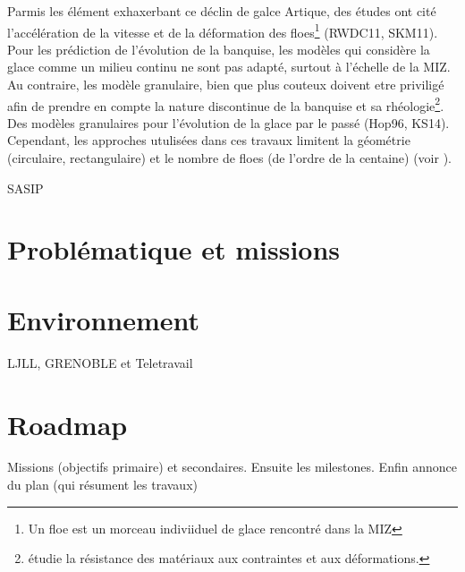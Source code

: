 Parmis les élément exhaxerbant ce déclin de galce Artique, des études ont cité l'accélération de la vitesse et de la déformation des floes\footnote{Un floe est un morceau indiviiduel de glace rencontré dans la MIZ} (RWDC11, SKM11). Pour les prédiction de l'évolution de la banquise, les modèles qui considère la glace comme un milieu continu ne sont pas adapté, surtout à l'échelle de la MIZ. Au contraire, les modèle granulaire, bien que plus couteux doivent etre priviligé afin de prendre en compte la nature discontinue de la banquise et sa rhéologie\footnote{étudie la résistance des matériaux aux contraintes et aux déformations.}. Des modèles granulaires pour l'évolution de la glace par le passé (Hop96, KS14). Cependant, les approches utulisées dans ces travaux limitent la géométrie (circulaire, rectangulaire) et le nombre de floes (de l'ordre de la centaine) (voir \parencite[p.16]{balasoiu2020halthesis}).


SASIP 








\section{Problématique et missions}













\section{Environnement}

LJLL, GRENOBLE et Teletravail










\section{Roadmap}
Missions (objectifs primaire) et secondaires. Ensuite les milestones. Enfin annonce du plan (qui résument les travaux)




